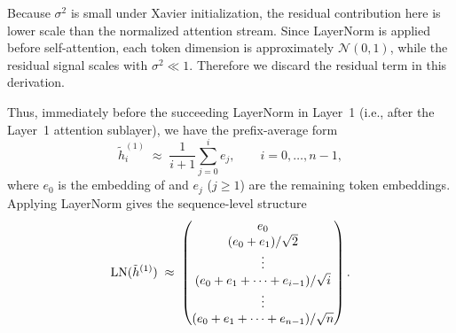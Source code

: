 \documentclass{article}
\theoremstyle{plain}
\theoremstyle{definition}
\theoremstyle{remark}
\begin{document}

Because \(\sigma^2\) is small under Xavier initialization, the residual contribution here is lower scale than the normalized attention stream. Since LayerNorm is applied before self-attention, each token dimension is approximately \(\mathcal{N}(0,1)\), while the residual signal scales with \(\sigma^2\ll 1\). Therefore we discard the residual term in this derivation.


Thus, immediately before the succeeding LayerNorm in Layer~1 (i.e., after the Layer~1 attention sublayer), we have the prefix-average form
\[
\tilde h_i^{(1)} \;\approx\; \frac{1}{i+1}\sum_{j=0}^{i} e_j,
\qquad i=0,\dots,n-1,
\]
where $e_0$ is the embedding of \bos and $e_j$ ($j\ge1$) are the remaining token embeddings.
Applying LayerNorm gives the sequence-level structure
\[
\mathrm{LN}(\tilde h^{(1)}) \;\approx\;
\begin{pmatrix}
e_0 \\
(e_0 + e_1)/\sqrt{2} \\
\vdots \\
(e_0 + e_1 + \cdots + e_{i-1})/\sqrt{i} \\
\vdots \\
(e_0 + e_1 + \cdots + e_{n-1})/\sqrt{n}
\end{pmatrix}.
\label{eq:app_bos_anchor_matrix}
\]
\end{document}
